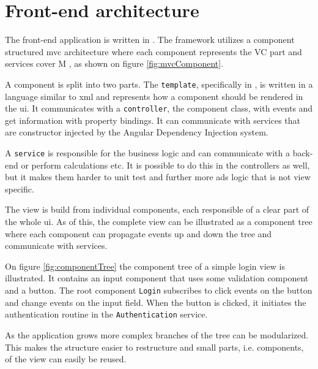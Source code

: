 \section{Front-end architecture}
The front-end application is written in .
The framework utilizes a component structured \gls{mvc} architecture where each component represents the VC part and services cover M \citep{architecture:ng}, as shown on figure \ref{fig:mvcComponent}.

A component is split into two parts.
The \verb+template+, specifically in , is written in a language similar to \gls{xml} and represents how a component should be rendered in the \gls{ui}.
It communicates with a \verb+controller+, the component class, with events and get information with property bindings.
It can communicate with services that are constructor injected by the Angular Dependency Injection system.

A \verb+service+ is responsible for the business logic and can communicate with a back-end or perform calculations etc.
It is possible to do this in the controllers as well, but it makes them harder to unit test and further more ads logic that is not view specific.


The view is build from individual components, each responsible of a clear part of the whole \gls{ui}.
As of this, the complete view can be illustrated as a component tree where each component can propagate events up and down the tree and communicate with services.

On figure \ref{fig:componentTree} the component tree of a simple login view is illustrated.
It contains an input component that uses some validation component and a button.
The root component \verb+Login+ subscribes to click events on the button and change events on the input field.
When the button is clicked, it initiates the authentication routine in the \verb+Authentication+ service.

As the application grows more complex branches of the tree can be modularized.
This makes the structure easier to restructure and small parts, i.e. components, of the view can easily be reused.





